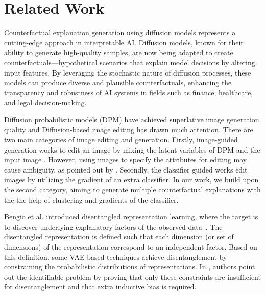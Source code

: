 \section{Related Work}
Counterfactual explanation generation using diffusion models represents a cutting-edge approach in interpretable AI. Diffusion models, known for their ability to generate high-quality samples, are now being adapted to create counterfactuals—hypothetical scenarios that explain model decisions by altering input features. By leveraging the stochastic nature of diffusion processes, these models can produce diverse and plausible counterfactuals, enhancing the transparency and robustness of AI systems in fields such as finance, healthcare, and legal decision-making.


Diffusion probabilistic models (DPM) have achieved superlative image generation quality \cite{DBLP:journals/corr/Sohl-DicksteinW15,DBLP:journals/corr/abs-1907-05600,DBLP:journals/corr/abs-2006-11239,DBLP:journals/corr/abs-2011-13456} and  Diffusion-based image editing has drawn much attention. There are two main categories of image editing and generation. Firstly, image-guided generation works to edit an image by mixing the latent variables of DPM and the input image \cite{DBLP:journals/corr/abs-2108-02938,DBLP:journals/corr/abs-2201-09865,DBLP:journals/corr/abs-2108-01073}. However, using images to specify the attributes for editing may cause ambiguity, as pointed out by \cite{kwon2023diffusion} . Secondly, the classifier guided works \cite{DBLP:journals/corr/abs-2105-05233, DBLP:journals/corr/abs-2111-14818, DBLP:journals/corr/abs-2112-05744} edit images by utilizing the gradient of an extra classifier. In our work, we build upon the second category, aiming to generate multiple counterfactual explanations with the the help of clustering and gradients of the classifier.

Bengio et al. introduced disentangled representation learning, where the target is to discover underlying explanatory factors of the observed data~\cite{DBLP:journals/corr/abs-1206-5538}. The disentangled representation is defined such that each dimension (or set of dimensions) of the representation correspond to an independent factor. Based on this definition, some VAE-based techniques achieve disentanglement  by constraining the probabilistic distributions of representations\cite{chen2018isolating,kim2018disentangling,higgins2016beta}. In \cite{DBLP:journals/corr/abs-1811-12359}, authors point out the identifiable problem by proving that only these constraints are insufficient for disentanglement and that extra inductive bias is required. 

